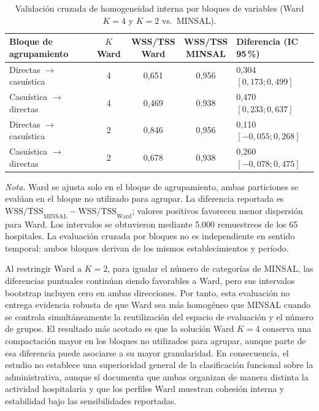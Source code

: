 \begin{table}[htbp]
\centering
\caption{Validación cruzada de homogeneidad interna por bloques de variables (Ward $K=4$ y $K=2$ vs.~MINSAL).}
\label{tab:homogeneidad-cruzada}

\begin{tabularx}{\textwidth}{>{\raggedright\arraybackslash}X c c c >{\centering\arraybackslash}p{3.3cm}}
\toprule
\textbf{Bloque de agrupamiento} & \textbf{$K$ Ward} &
\shortstack{\textbf{WSS/TSS}\\\textbf{Ward}} & \shortstack{\textbf{WSS/TSS}\\\textbf{MINSAL}} &
\textbf{Diferencia (IC 95\,\%)} \\
\midrule
Directas $\rightarrow$ casuística & 4 & 0,651 & 0,956 &
\shortstack{0,304\\$[0,173;0,499]$} \\
Casuística $\rightarrow$ directas & 4 & 0,469 & 0,938 &
\shortstack{0,470\\$[0,233;0,637]$} \\
\addlinespace
Directas $\rightarrow$ casuística & 2 & 0,846 & 0,956 &
\shortstack{0,110\\$[-0,055;0,268]$} \\
Casuística $\rightarrow$ directas & 2 & 0,678 & 0,938 &
\shortstack{0,260\\$[-0,078;0,475]$} \\
\bottomrule
\end{tabularx}
\par\smallskip
\begin{minipage}{\textwidth}
\normalsize\raggedright
\textit{Nota.} Ward se ajusta solo en el bloque de agrupamiento, ambas particiones se evalúan en el bloque no utilizado para agrupar. La diferencia reportada es $\mathrm{WSS/TSS}_{\mathrm{MINSAL}}-\mathrm{WSS/TSS}_{\mathrm{Ward}}$; valores positivos favorecen menor dispersión para Ward. Los intervalos se obtuvieron mediante 5.000 remuestreos de los
65 hospitales. La evaluación cruzada por bloques no es independiente en sentido
temporal: ambos bloques derivan de los mismos establecimientos y período.
\end{minipage}
\end{table}

Al restringir Ward a $K=2$, para igualar el número de categorías de MINSAL, las
diferencias puntuales continúan siendo favorables a Ward, pero sus intervalos
bootstrap incluyen cero en ambas direcciones. Por tanto, esta evaluación no
entrega evidencia robusta de que Ward sea más homogéneo que MINSAL cuando se
controla simultáneamente la reutilización del espacio de evaluación y el número
de grupos. El resultado más acotado es que la solución Ward $K=4$ conserva una
compactación mayor en los bloques no utilizados para agrupar, aunque parte de esa diferencia puede
asociarse a su mayor granularidad. En consecuencia, el estudio no establece una
superioridad general de la clasificación funcional sobre la administrativa, aunque sí
documenta que ambas organizan de manera distinta la actividad hospitalaria y que
los perfiles Ward muestran cohesión interna y estabilidad bajo las sensibilidades
reportadas.

